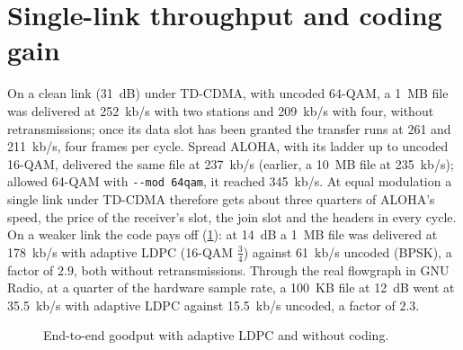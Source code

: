 \documentclass[11pt,a4paper,oneside]{report}
\newcommand{\code}[1]{\texttt{\small #1}}
\begin{document}
\section{Single-link throughput and coding gain}
On a clean link (\SI{31}{dB}) under TD-CDMA, with uncoded 64-QAM, a \SI{1}{MB} file was delivered at
\SI{252}{kb/s} with two stations and \SI{209}{kb/s} with four, without retransmissions; once its data slot
has been granted the transfer runs at 261 and \SI{211}{kb/s}, four frames per cycle. Spread ALOHA, with
its ladder up to uncoded 16-QAM, delivered the same file at \SI{237}{kb/s} (earlier, a \SI{10}{MB} file
at \SI{235}{kb/s}); allowed 64-QAM with \code{-{}-mod 64qam}, it reached \SI{345}{kb/s}. At equal
modulation a single link under TD-CDMA therefore gets about three quarters of ALOHA's speed, the
price of the receiver's slot, the join slot and the headers in every cycle. On a weaker link the code
pays off (\cref{fig:codinggain}): at \SI{14}{dB} a \SI{1}{MB} file was delivered at \SI{178}{kb/s} with
adaptive LDPC (16-QAM $\tfrac34$) against \SI{61}{kb/s} uncoded (BPSK), a factor of $2.9$, both without
retransmissions. Through the real flowgraph in GNU Radio, at a quarter of the hardware sample rate, a
\SI{100}{KB} file at \SI{12}{dB} went at \SI{35.5}{kb/s} with adaptive LDPC against \SI{15.5}{kb/s}
uncoded, a factor of $2.3$.

\begin{figure}[htbp]
\centering
{}
\caption{End-to-end goodput with adaptive LDPC and without coding.}\label{fig:codinggain}
\end{figure}
\end{document}
